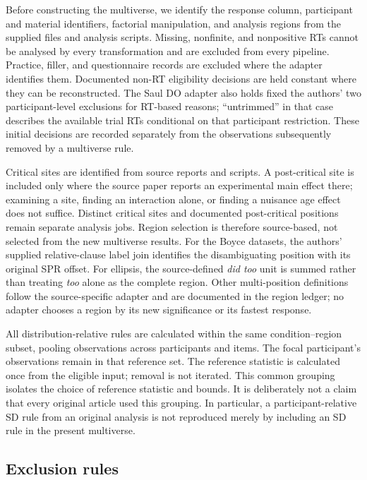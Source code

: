 Before constructing the multiverse, we identify the response column,
participant and material identifiers, factorial manipulation, and analysis
regions from the supplied files and analysis scripts. Missing, nonfinite,
and nonpositive RTs cannot be analysed by every transformation and are
excluded from every pipeline. Practice, filler, and questionnaire records
are excluded where the adapter identifies them. Documented non-RT
eligibility decisions are held constant where they can be reconstructed.
The Saul DO adapter also holds fixed the authors' two participant-level
exclusions for RT-based reasons; ``untrimmed'' in that case describes the
available trial RTs conditional on that participant restriction.
These initial decisions are recorded separately from the observations
subsequently removed by a multiverse rule.

Critical sites are identified from source reports and scripts. A post-critical
site is included only where the source paper reports an experimental main
effect there; examining a site, finding an interaction alone, or finding a
nuisance age effect does not suffice. Distinct critical sites and documented
post-critical positions remain separate analysis jobs. Region selection is
therefore source-based, not selected from the new multiverse results. For the
Boyce datasets, the authors' supplied relative-clause label join identifies
the disambiguating position with its original SPR offset. For ellipsis,
the source-defined \emph{did too} unit is summed rather than treating
\emph{too} alone as the complete region. Other multi-position definitions
follow the source-specific adapter and are documented in the region ledger;
no adapter chooses a region by its new significance or its fastest response.

All distribution-relative rules are calculated within the same
condition--region subset, pooling observations across participants and
items. The focal participant's observations remain in that reference set.
The reference statistic is calculated once from the eligible input; removal
is not iterated. This common grouping isolates the choice of reference
statistic and bounds. It is deliberately not a claim that every original
article used this grouping. In particular, a participant-relative SD rule
from an original analysis is not reproduced merely by including an SD rule
in the present multiverse.

\subsection{Exclusion rules}

